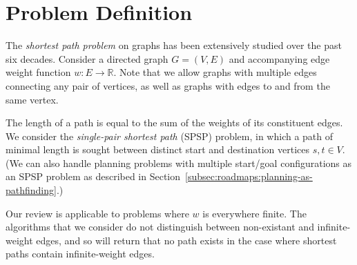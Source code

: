 \section{Problem Definition}
\label{subsec:ibid-probdef}

The \emph{shortest path problem} on graphs has been extensively
studied over the past six decades.
Consider a directed graph $G = (V,E)$ and accompanying edge weight
function $w : E \rightarrow \mathbb{R}$.
Note that we allow graphs with multiple edges connecting any pair
of vertices,
as well as graphs with edges to and from the same vertex.

The length of a path is equal to the sum of the weights of its
constituent edges.
We consider the \emph{single-pair shortest path} (SPSP) problem,
in which a path of minimal length is sought
between distinct start and destination vertices
$s,t \in V$.
(We can also handle planning problems with multiple
start/goal configurations as an SPSP problem
as described in Section~\ref{subsec:roadmaps:planning-as-pathfinding}.)

Our review is applicable to problems where $w$ is everywhere finite.
The algorithms that we consider do not distinguish between non-existant
and infinite-weight edges,
and so will return that no path exists in the case where shortest
paths contain infinite-weight edges.

